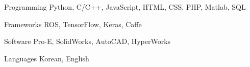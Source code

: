 


\begin{cvskills}


\cvskill
{Programming} %
{Python, C/C++, JavaScript, HTML, CSS, PHP, Matlab, SQL} %


\cvskill
{Frameworks} %
{ROS, TensorFlow, Keras, Caffe} %


\cvskill
{Software} %
{Pro-E, SolidWorks, AutoCAD, HyperWorks} %


\cvskill
{Languages} %
{Korean, English} %


\end{cvskills}